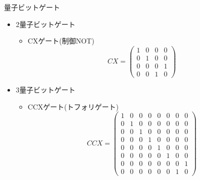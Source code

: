 \begin{frame}[t,fragile]{量子ビットゲート}
  \begin{itemize}
  \item 2量子ビットゲート
    \begin{itemize}
    \item CXゲート(制御NOT)
      \[
      CX = \begin{pmatrix} 1 & 0 & 0 & 0 \\ 0 & 1 & 0 & 0 \\ 0 & 0 & 0 & 1 \\ 0 & 0 & 1 & 0 \end{pmatrix}
      \]
    \end{itemize}
  \item 3量子ビットゲート
    \begin{itemize}
    \item CCXゲート(トフォリゲート)
      \[
      CCX = \begin{pmatrix}
        1 & 0 & 0 & 0 & 0 & 0 & 0 & 0 \\
        0 & 1 & 0 & 0 & 0 & 0 & 0 & 0 \\
        0 & 0 & 1 & 0 & 0 & 0 & 0 & 0 \\
        0 & 0 & 0 & 1 & 0 & 0 & 0 & 0 \\
        0 & 0 & 0 & 0 & 1 & 0 & 0 & 0 \\
        0 & 0 & 0 & 0 & 0 & 1 & 0 & 0 \\
        0 & 0 & 0 & 0 & 0 & 0 & 0 & 1 \\
        0 & 0 & 0 & 0 & 0 & 0 & 1 & 0 \end{pmatrix}
      \]
    \end{itemize}
  \end{itemize}
\end{frame}
